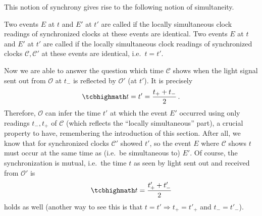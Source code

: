 This notion of synchrony gives rise to the following notion of simultaneity.
\begin{defi}[Simultaneity]\label{defi:simultaneity}
	Two events $E$ at $t$ and $E'$ at $t'$ are called  if the locally simultaneous clock readings of synchronized clocks at these events are identical.%
	Two events $E$ at $t$ and $E'$ at $t'$ are called  if the locally simultaneous clock readings of synchronized clocks $\mathcal{C}, \mathcal{C}'$ at these events are identical, i.e.~$t = t'$.
\end{defi}

Now we are able to answer the question which time $\mathcal{C}$ shows when the light signal sent out from $\mathcal{O}$ at $t_-$ is reflected by $\mathcal{O}'$ (at $t'$). It is precisely
\begin{equation}\label{eq:simult_explicit}
	\eqbox{
	t = t' = \frac{t_+ + t_-}{2}
	} \, .
\end{equation}
Therefore, $\mathcal{O}$ can infer the time $t'$ at which the event $E'$ occurred using only readings $t_-, t_+$ of $\mathcal{C}$ (which reflects the \enquote{locally simultaneous} part), a crucial property to have, remembering the introduction of this section. After all, we know that for synchronized clocks $\mathcal{C}'$ showed $t'$, so the event $E$ where $\mathcal{C}$ shows $t$ must occur at the same time as (i.e.~be simultaneous to) $E'$. Of course, the synchronization is mutual, i.e.~the time $t$ as seen by light sent out and received from $\mathcal{O}'$ is
\begin{equation}
	\eqbox{
	t = \frac{t'_+ + t'_-}{2}
	}
\end{equation}
holds as well (another way to see this is that $t = t' \Rightarrow t_+ = t'_+$ and $t_- = t'_-$).


